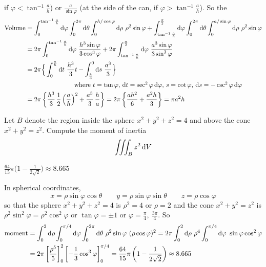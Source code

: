 \begin{solution}
if $\varphi<\tan^{-1}\frac{a}{h}$)
or $\frac{a}{\sin\varphi}$ (at the side of the can, if $\varphi>\tan^{-1}\frac{a}{h}$). So the
\begin{align*}
\text{Volume} 
&= \int_{0}^{\tan^{-1}{a\over h}} \mathrm{d}\varphi \int_{0}^{2\pi} \mathrm{d}\theta
\int_0^{h/\cos\varphi}\mathrm{d}\rho\ \rho^2\sin\varphi
+\int_{\tan^{-1}{a\over h}}^{{\pi\over 2}} \mathrm{d}\varphi \int_{0}^{2\pi} \mathrm{d}\theta
\int_0^{a/\sin\varphi}\mathrm{d}\rho\ \rho^2\sin\varphi \\
&= 2\pi\int_{0}^{\tan^{-1}{a\over h}} \mathrm{d}\varphi 
\ \frac{h^3\sin\varphi}{3\cos^3\varphi}
+2\pi\int_{\tan^{-1}{a\over h}}^{{\pi\over 2}} \mathrm{d}\varphi 
\ \frac{a^3\sin\varphi}{3\sin^3\varphi} \\
&=2\pi\Big\{\int_0^{{a\over h}}\mathrm{d}t\ \frac{h^3}{3}t
-\int^0_{{h\over a}}\mathrm{d}s\ \frac{a^3}{3}\Big\} \\
&\hskip1in\hbox{ where $t=\tan\varphi$, $\mathrm{d}t=\sec^2\varphi\,\mathrm{d}\varphi$,
$s=\cot\varphi$, $\mathrm{d}s=-\csc^2\varphi\,\mathrm{d}\varphi$} \\
&=2\pi\left\{\frac{h^3}{3}\,\frac{1}{2}\left(\frac{a}{h}\right)^2
+\frac{a^3}{3}\,\frac{h}{a}\right\}
=2\pi\left\{\frac{ah^2}{6}+\frac{a^2h}{3}\right\}
=\pi a^2h
\end{align*}
\end{solution}

\begin{question} [M200 2003A] %
Let $B$ denote the region inside the sphere $x^2+y^2+z^2=4$
and above the cone $x^2+y^2=z^2$. Compute the moment of inertia
\begin{equation*}
\iiint_B z^2\,\mathrm{d}V
\end{equation*}
\end{question}

%

\begin{answer}
$\frac{64}{15}\pi\big(1-\frac{1}{2\sqrt{2}}\big)\approx 8.665 $
\end{answer}

\begin{solution}
In spherical coordinates,
\begin{equation*}
x=\rho\sin\varphi\cos\theta\qquad y=\rho\sin\varphi\sin\theta\qquad z=\rho\cos\varphi
\end{equation*}
so that the sphere $x^2+y^2+z^2=4$ is $\rho^2=4$ or $\rho=2$ and the 
cone $x^2+y^2=z^2$ is $\rho^2\sin^2\varphi=\rho^2\cos^2\varphi$ or $\tan\varphi=\pm1$
or $\varphi=\frac{\pi}{4},\ \frac{3\pi}{4}$. So
\begin{align*}
\text{moment}
&=\int_0^2\dee{\rho}\int_0^{\pi/4}\dee{\varphi}\int_0^{2\pi}\dee{\theta}\ \rho^2\sin\varphi
                                           \  (\rho\cos\varphi)^2
=2\pi\int_0^2 \dee{\rho}\ \rho^4\int_0^{\pi/4}\dee{\varphi}\ \sin\varphi\cos^2\varphi\\
&=2\pi\left[\frac{\rho^5}{5}\right]_0^2
    \left[-\frac{1}{3}\cos^3\varphi\right]_0^{\pi/4}
=\frac{64}{15}\pi\left(1-\frac{1}{2\sqrt{2}}\right)\approx 8.665 
\end{align*}
\end{solution}

